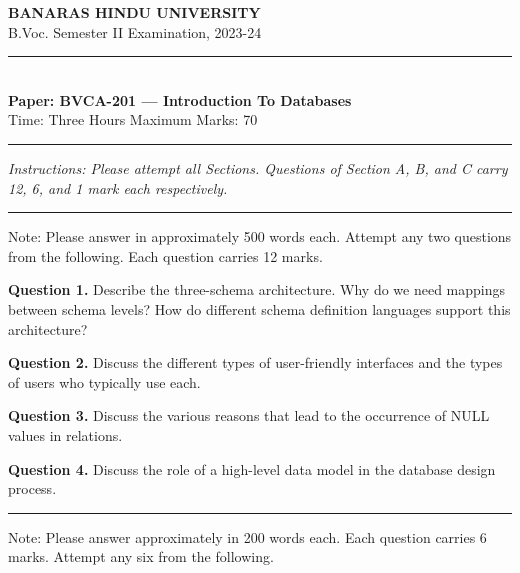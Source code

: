 \documentclass[11pt,a4paper]{article}
\begin{document}
\begin{center}
  {\large\bfseries BANARAS HINDU UNIVERSITY}\\[2pt]
  {\normalsize B.Voc. Semester II Examination, 2023-24}\\[6pt]
  \rule{0.8\linewidth}{0.5pt}\\[6pt]
  {\large\bfseries Paper: BVCA-201 --- Introduction To Databases}\\[4pt]
  {\normalsize Time: Three Hours \hfill Maximum Marks: 70}
\end{center}

\rule{\linewidth}{0.4pt}

\smallskip



\noindent   \textit{Instructions: Please attempt all Sections. Questions of Section A, B, and C carry 12, 6, and 1 mark each respectively.}

\bigskip

\bigskip


\rule{\linewidth}{0.4pt}\smallskip

Note: Please answer in approximately 500 words each. Attempt any two questions from the following. Each question carries 12 marks.

\medskip


\noindent   \textbf{Question 1.} Describe the three-schema architecture. Why do we need mappings between schema levels? How do different schema definition languages support this architecture?

\medskip


\noindent   \textbf{Question 2.} Discuss the different types of user-friendly interfaces and the types of users who typically use each.

\medskip


\noindent   \textbf{Question 3.} Discuss the various reasons that lead to the occurrence of NULL values in relations.

\medskip


\noindent   \textbf{Question 4.} Discuss the role of a high-level data model in the database design process.

\bigskip


\rule{\linewidth}{0.4pt}\smallskip

Note: Please answer approximately in 200 words each. Each question carries 6 marks. Attempt any six from the following.

\medskip
\end{document}

